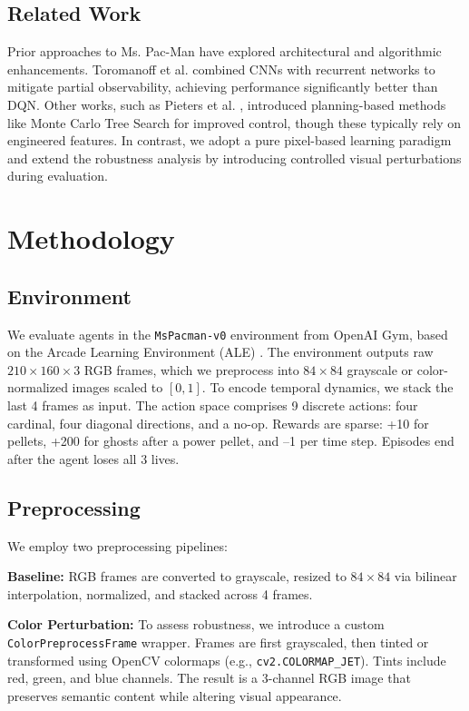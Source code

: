 \documentclass{article}
\begin{document}
\subsection{Related Work}

Prior approaches to Ms. Pac-Man have explored architectural and algorithmic enhancements. Toromanoff et al. \cite{toromanoff2019deep} combined CNNs with recurrent networks to mitigate partial observability, achieving performance significantly better than DQN. Other works, such as Pieters et al. \cite{pieters2016monte}, introduced planning-based methods like Monte Carlo Tree Search for improved control, though these typically rely on engineered features. In contrast, we adopt a pure pixel-based learning paradigm and extend the robustness analysis by introducing controlled visual perturbations during evaluation.

\section{Methodology}

\subsection{Environment}

We evaluate agents in the \texttt{MsPacman-v0} environment from OpenAI Gym, based on the Arcade Learning Environment (ALE) \cite{ale}. The environment outputs raw $210 \times 160 \times 3$ RGB frames, which we preprocess into $84 \times 84$ grayscale or color-normalized images scaled to $[0, 1]$. To encode temporal dynamics, we stack the last 4 frames as input. The action space comprises 9 discrete actions: four cardinal, four diagonal directions, and a no-op. Rewards are sparse: +10 for pellets, +200 for ghosts after a power pellet, and –1 per time step. Episodes end after the agent loses all 3 lives.

\subsection{Preprocessing}

We employ two preprocessing pipelines:

\textbf{Baseline:} RGB frames are converted to grayscale, resized to $84 \times 84$ via bilinear interpolation, normalized, and stacked across 4 frames.

\textbf{Color Perturbation:} To assess robustness, we introduce a custom \texttt{ColorPreprocessFrame} wrapper. Frames are first grayscaled, then tinted or transformed using OpenCV colormaps (e.g., \texttt{cv2.COLORMAP\_JET}). Tints include red, green, and blue channels. The result is a 3-channel RGB image that preserves semantic content while altering visual appearance.
\end{document}
